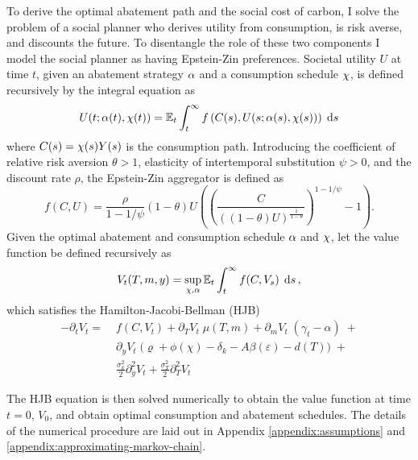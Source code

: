 \documentclass[../../main.tex]{subfiles}
\begin{document}
To derive the optimal abatement path and the social cost of carbon, I solve the problem of a social planner who derives utility from consumption, is risk averse, and discounts the future. To disentangle the role of these two components I model the social planner as having Epstein-Zin preferences. Societal utility $U$ at time $t$, given an abatement strategy $\alpha$ and a consumption schedule $\chi$, is defined recursively by the integral equation as \begin{equation} \label{eq:utility}
    U(t; \alpha(t), \chi(t)) = \mathbb{E}_t \int^{\infty}_t f\left(C(s), U(s; \alpha(s), \chi(s))\right) \; \dd{s}
\end{equation} where $C(s) = \chi(s) Y(s)$ is the consumption path. Introducing the coefficient of relative risk aversion $\theta > 1$, elasticity of intertemporal substitution $\psi > 0$, and the discount rate $\rho$, the Epstein-Zin aggregator \citep{duffie_asset_1992} is defined as \begin{equation} \label{eq:aggregator}
    f(C, U) = \frac{\rho}{1 - 1 / \psi} (1 - \theta) U  \left( \left(\frac{C}{((1 - \theta) U)^{\frac{1}{1 - \theta}}}\right)^{1 - 1 / \psi} - 1 \right).
\end{equation} Given the optimal abatement and consumption schedule $\alpha$ and $\chi$, let the value function be defined recursively as \begin{equation}
    V_t(T, m, y) = \sup_{\chi, \alpha} \mathbb{E}_t \int^{\infty}_t f(C, V_s) \; \dd{s},
\end{equation} which satisfies the  Hamilton-Jacobi-Bellman (HJB) \begin{equation}
    \begin{split}
        -\partial_t V_t = \; &f(C, V_t) + \partial_T V_t \; \mu(T, m) + \partial_m V_t \; (\gamma_t - \alpha) \; + \\
        &\partial_y V_t \; \Big(\varrho + \phi(\chi) - \delta_k - A \beta(\varepsilon) - d(T) \Big) \; + \\
        &\frac{\sigma^2_k}{2} \partial^2_y V_t + \frac{\sigma^2_T}{2} \partial^2_T V_t
    \end{split}
\end{equation}

The HJB equation is then solved numerically to obtain the value function at time $t = 0$, $V_0$, and obtain optimal consumption and abatement schedules. The details of the numerical procedure are laid out in Appendix \ref{appendix:assumptions} and \ref{appendix:approximating-markov-chain}.
\end{document}
